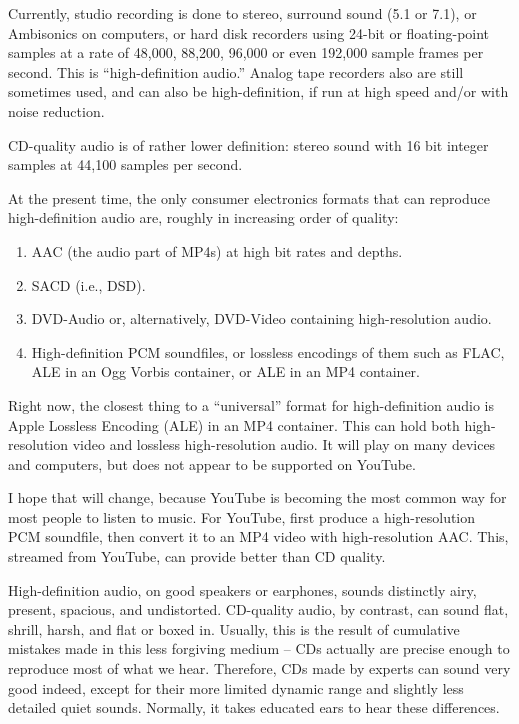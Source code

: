 \documentclass[english,11pt,letterpaper,onecolumn]{scrartcl}
\begin{document}
Currently, studio recording is done to stereo, surround sound (5.1 or 7.1), or 
Ambisonics on computers, or hard disk recorders using 24-bit or floating-point 
samples at a rate of 48,000, 88,200, 96,000 or even 192,000 sample frames per 
second. This is ``high-definition audio.'' Analog tape recorders also are still 
sometimes used, and can also be high-definition, if run at high speed and/or 
with noise reduction.

CD-quality audio is of rather lower definition: stereo sound 
with 16 bit integer samples at 44,100 samples per second. 

At the present time, the only consumer electronics formats that can reproduce 
high-definition audio are, roughly in increasing order of quality:
\begin{enumerate}
 \item AAC (the audio part of MP4s) at high bit rates and depths.
 \item SACD (i.e., DSD).
 \item DVD-Audio or, alternatively, DVD-Video containing high-resolution audio.
 \item High-definition PCM soundfiles, or lossless encodings of them 
such as FLAC, ALE in an Ogg Vorbis container, or ALE in an MP4 container.
\end{enumerate}

Right now, the closest thing to a ``universal'' format for high-definition 
audio is Apple Lossless Encoding (ALE) in an MP4 container. This can hold  
both high-resolution video and lossless high-resolution audio. It will play on 
many devices and computers, but does not appear to be supported on YouTube. 

I hope that will change, because YouTube is becoming the most common way 
for most people to listen to music. For YouTube, first produce a 
high-resolution PCM soundfile, then convert it to an MP4 video with 
high-resolution AAC. This, streamed from YouTube, can provide better than CD 
quality.

High-definition audio, on good speakers or earphones, sounds distinctly airy, 
present, spacious, and undistorted. CD-quality audio, by contrast, can sound 
flat, shrill, harsh, and flat or boxed in. Usually, this is the result of 
cumulative mistakes made in this less forgiving medium -- CDs actually are 
precise enough to reproduce most of what we hear. Therefore, CDs made by 
experts can sound very good indeed, except for their more limited dynamic range 
and slightly less detailed quiet sounds. Normally, it takes educated ears to 
hear these differences.
\end{document}
